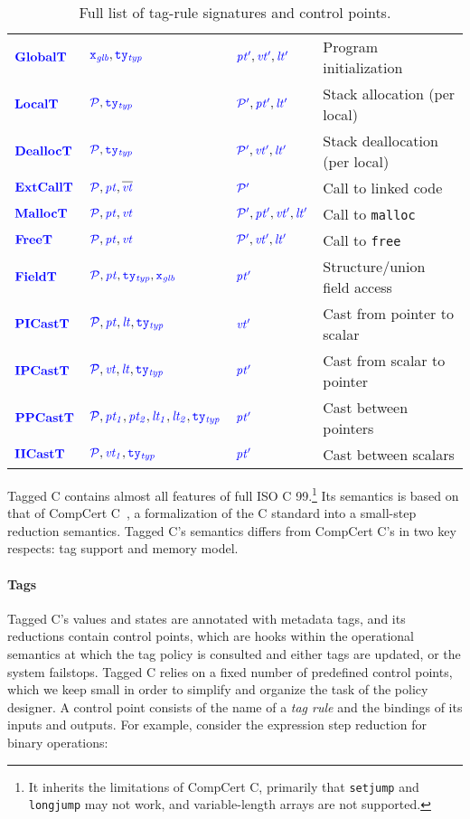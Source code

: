 \begin{table}[t]
\begin{center}
\begin{tabular}{|l|l|l|l|}
    \(\globaltname\)    & \(\globaltargs\)       & \(\globaltres\)    & Program initialization \\
    \(\localtname\)     & \(\localtargs\)        & \(\localtres\)     & Stack allocation (per local) \\
    \(\dealloctname\)   & \(\dealloctargs\)      & \(\dealloctres\)   & Stack deallocation (per local) \\
    \(\extcalltname\)   & \(\extcalltargs\)      & \(\extcalltres\)   & Call to linked code \\
    \(\malloctname\)    & \(\malloctargs\)       & \(\malloctres\)    & Call to {\tt malloc} \\
    \(\freetname\)      & \(\freetargs\)         & \(\freetres\)      & Call to {\tt free} \\
    \(\fieldtname\)     & \(\fieldtargs\)        & \(\fieldtres\)     & Structure/union field access \\
    \(\picasttname\)    & \(\picasttargs\)       & \(\picasttres\)    & Cast from pointer to scalar \\
    \(\ipcasttname\)    & \(\ipcasttargs\)       & \(\ipcasttres\)    & Cast from scalar to pointer \\
    \(\ppcasttname\)    & \(\ppcasttargs\)       & \(\ppcasttres\)    & Cast between pointers \\
    \(\iicasttname\)    & \(\iicasttargs\)       & \(\iicasttres\)    & Cast between scalars \\
    \hline
  \end{tabular}
\end{center}

  \caption{Full list of tag-rule signatures and control points. %
}
  \label{ch4:fig:controlpoints}
\end{table}

Tagged C contains almost all features of full ISO C 99.\footnote{
It inherits the limitations of CompCert C, primarily that {\tt setjump} and {\tt longjump}
may not work, and variable-length arrays are not supported.}
Its semantics is based on that of CompCert C~\cite{Leroy09:CompCert},
a formalization of the C standard into a small-step reduction semantics.
Tagged C's semantics differs from CompCert C's in two key respects: tag support and memory model.

\paragraph{Tags}
Tagged C's values
and states are annotated with metadata tags, and its reductions contain
control points, which are hooks within the
operational semantics at which the tag policy is consulted and either tags are updated, or the system
failstops.
Tagged C relies on a fixed number of predefined control points, which we keep small
in order to simplify and organize the task of the policy designer.
A control point consists of the name of a {\em tag rule}
and the bindings of its inputs and outputs. For example, consider the expression step reduction
for binary operations:

